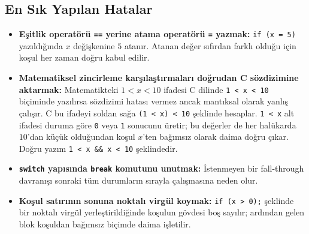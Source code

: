 \subsection{En Sık Yapılan Hatalar}
\begin{itemize}
    \item \textbf{Eşitlik operatörü \texttt{==} yerine atama operatörü \texttt{=} yazmak:}
    \texttt{if (x = 5)} yazıldığında $x$ değişkenine $5$ atanır. Atanan değer sıfırdan farklı olduğu için koşul her zaman doğru kabul edilir.
    \item \textbf{Matematiksel zincirleme karşılaştırmaları doğrudan C sözdizimine aktarmak:}
    Matematikteki $1 < x < 10$ ifadesi C dilinde \texttt{1 < x < 10} biçiminde yazılırsa sözdizimi hatası vermez ancak mantıksal olarak yanlış çalışır. C bu ifadeyi soldan sağa \texttt{(1 < x) < 10} şeklinde hesaplar. \texttt{1 < x} alt ifadesi duruma göre \texttt{0} veya \texttt{1} sonucunu üretir; bu değerler de her halükarda $10$'dan küçük olduğundan koşul $x$'ten bağımsız olarak daima doğru çıkar. Doğru yazım \texttt{1 < x \&\& x < 10} şeklindedir.
    \item \textbf{\texttt{switch} yapısında \texttt{break} komutunu unutmak:}
    İstenmeyen bir fall-through davranışı sonraki tüm durumların sırayla çalışmasına neden olur.
    \item \textbf{Koşul satırının sonuna noktalı virgül koymak:}
    \texttt{if (x > 0);} şeklinde bir noktalı virgül yerleştirildiğinde koşulun gövdesi boş sayılır; ardından gelen blok koşuldan bağımsız biçimde daima işletilir.
\end{itemize}

